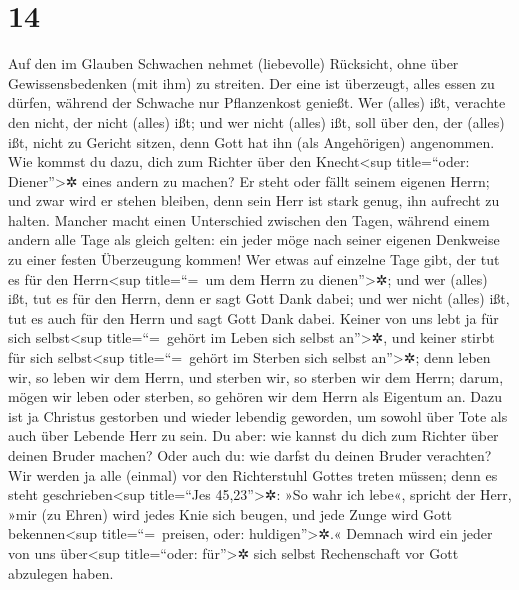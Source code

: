 \hypertarget{section-13}{%
\section{14}\label{section-13}}

 Auf den im Glauben Schwachen nehmet (liebevolle)
Rücksicht, ohne über Gewissensbedenken (mit ihm) zu streiten.
 Der eine ist überzeugt, alles essen zu dürfen, während
der Schwache nur Pflanzenkost genießt.  Wer (alles) ißt,
verachte den nicht, der nicht (alles) ißt; und wer nicht (alles) ißt,
soll über den, der (alles) ißt, nicht zu Gericht sitzen, denn Gott hat
ihn (als Angehörigen) angenommen.  Wie kommst du dazu,
dich zum Richter über den Knecht\textless sup title=``oder:
Diener''\textgreater✲ eines andern zu machen? Er steht oder fällt seinem
eigenen Herrn; und zwar wird er stehen bleiben, denn sein Herr ist stark
genug, ihn aufrecht zu halten.  Mancher macht einen
Unterschied zwischen den Tagen, während einem andern alle Tage als
gleich gelten: ein jeder möge nach seiner eigenen Denkweise zu einer
festen Überzeugung kommen!  Wer etwas auf einzelne Tage
gibt, der tut es für den Herrn\textless sup title=``=~um dem Herrn zu
dienen''\textgreater✲; und wer (alles) ißt, tut es für den Herrn, denn
er sagt Gott Dank dabei; und wer nicht (alles) ißt, tut es auch für den
Herrn und sagt Gott Dank dabei.  Keiner von uns lebt ja
für sich selbst\textless sup title=``=~gehört im Leben sich selbst
an''\textgreater✲, und keiner stirbt für sich selbst\textless sup
title=``=~gehört im Sterben sich selbst an''\textgreater✲;
 denn leben wir, so leben wir dem Herrn, und sterben wir,
so sterben wir dem Herrn; darum, mögen wir leben oder sterben, so
gehören wir dem Herrn als Eigentum an.  Dazu ist ja
Christus gestorben und wieder lebendig geworden, um sowohl über Tote als
auch über Lebende Herr zu sein.  Du aber: wie kannst du
dich zum Richter über deinen Bruder machen? Oder auch du: wie darfst du
deinen Bruder verachten? Wir werden ja alle (einmal) vor den
Richterstuhl Gottes treten müssen;  denn es steht
geschrieben\textless sup title=``Jes 45,23''\textgreater✲: »So wahr ich
lebe«, spricht der Herr, »mir (zu Ehren) wird jedes Knie sich beugen,
und jede Zunge wird Gott bekennen\textless sup title=``=~preisen, oder:
huldigen''\textgreater✲.«  Demnach wird ein jeder von uns
über\textless sup title=``oder: für''\textgreater✲ sich selbst
Rechenschaft vor Gott abzulegen haben.

